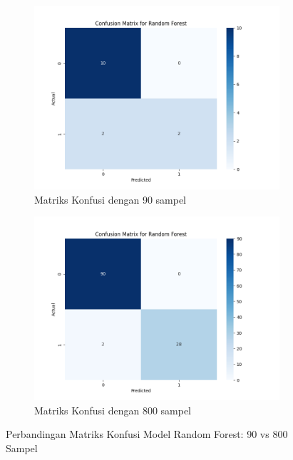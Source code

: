 \begin{figure}[htbp]
    \centering
    \begin{subfigure}{0.48\textwidth}
        \centering
        \includegraphics[width=\textwidth]{figures/confusion_matrix_rf_90.png}
        \caption{Matriks Konfusi dengan 90 sampel}
        \label{fig:confusion_matrix_90}
    \end{subfigure}
    \hfill
    \begin{subfigure}{0.48\textwidth}
        \centering
        \includegraphics[width=\textwidth]{figures/confusion_matrix_rf_800.png}
        \caption{Matriks Konfusi dengan 800 sampel}
        \label{fig:confusion_matrix_800}
    \end{subfigure}
    \caption{Perbandingan Matriks Konfusi Model Random Forest: 90 vs 800 Sampel}
    \label{fig:confusion_matrix_comparison}
\end{figure}

